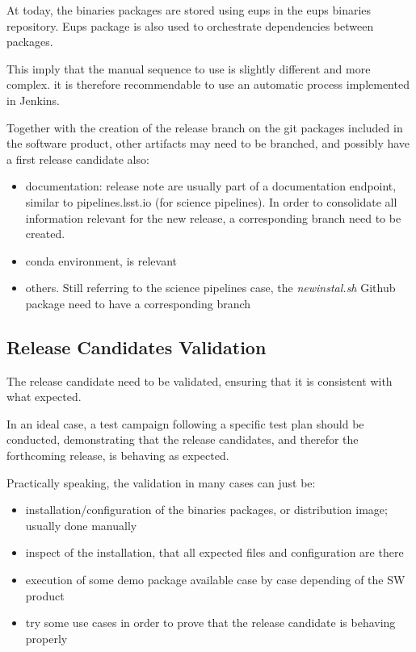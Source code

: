 At today, the binaries packages are stored using eups in the eups binaries repository. 
Eups package is also used to orchestrate dependencies between packages.

This imply that the manual sequence to use is slightly different and more complex. it is therefore recommendable to use an automatic process implemented in Jenkins.


Together with the creation of the release branch on the git packages included in the software product, other artifacts may need to be branched, and possibly have a first release candidate also:

\begin{itemize}
\item documentation: release note are usually part of a documentation endpoint, similar to pipelines.lsst.io (for science pipelines). In order to consolidate all information relevant for the new release, a corresponding branch need to be created.
\item conda environment, is relevant
\item others. Still referring to the science pipelines case, the \textit{newinstal.sh} Github package need to have a corresponding branch
\end{itemize}

\subsection{Release Candidates Validation} \label{sect:rcvalidation}

The release candidate need to be validated, ensuring that it is consistent with what expected.

In an ideal case, a test campaign following a specific test plan should be conducted, demonstrating that the release candidates, and therefor the forthcoming release, is behaving as expected.

Practically speaking, the validation in many cases can just be:

\begin{itemize}
\item installation/configuration of the binaries packages, or distribution image; usually done manually
\item inspect of the installation, that all expected files and configuration are there
\item execution of some demo package available case by case depending of the SW product
\item try some use cases in order to prove that the release candidate is behaving properly
\end{itemize}

